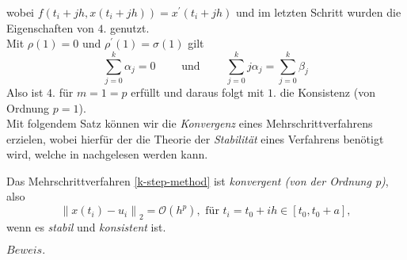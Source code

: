 wobei $f(t_i+jh,x(t_i+jh)) = x^{\prime}(t_i+jh)$ und im letzten Schritt wurden die Eigenschaften von $4.$ genutzt.\\
Mit $\rho(1) = 0$ und $\rho^{\prime}(1)=\sigma(1)$ gilt
\[
    \sum_{j=0}^{k} \alpha_j = 0 \qquad \text{ und } \qquad \sum_{j=0}^{k} j \alpha_j = \sum_{j=0}^{k} \beta_j
\]
Also ist $4.$ für $m=1=p$ erfüllt und daraus folgt mit $1.$ die Konsistenz (von Ordnung $p=1$). \qedwhite \\
Mit folgendem Satz können wir die \textit{Konvergenz} eines Mehrschrittverfahrens erzielen, wobei hierfür der die
Theorie der \textit{Stabilität} eines Verfahrens benötigt wird, welche in
\cite[80]{hairerSolvingOrdinaryDifferential} nachgelesen werden kann.
\begin{satz}
    Das Mehrschrittverfahren \eqref{k-step-method} ist {\em konvergent (von der Ordnung p)}, also
    \[
        \left\lVert x(t_i) - u_i \right\rVert_2 = \mathcal{O}(h^p), \text{ für } t_i=t_0+ih \in [t_0,t_0+a],
    \]
    wenn es {\em stabil} und {\em konsistent} ist.
\end{satz}
$Beweis.$ \cite[392-393]{hairerSolvingOrdinaryDifferential}
